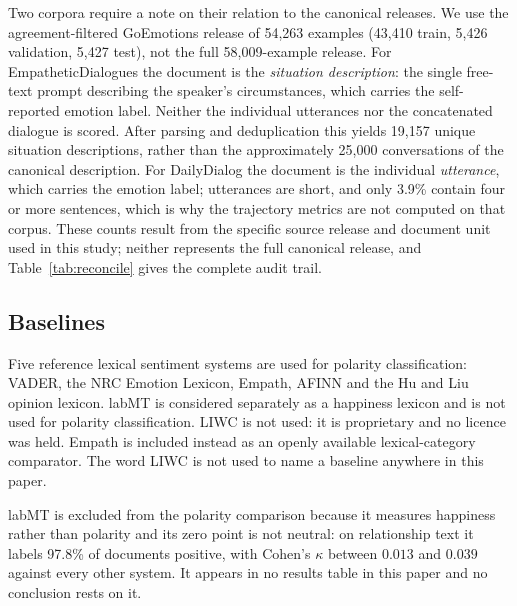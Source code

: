 \documentclass[fleqn,10pt]{wlscirep}
\begin{document}
Two corpora require a note on their relation to the canonical releases. We use the agreement-filtered GoEmotions release of 54{,}263 examples (43{,}410 train, 5{,}426 validation, 5{,}427 test), not the full 58{,}009-example release. For EmpatheticDialogues the document is the \emph{situation description}: the single free-text prompt describing the speaker's circumstances, which carries the self-reported emotion label. Neither the individual utterances nor the concatenated dialogue is scored. After parsing and deduplication this yields 19{,}157 unique situation descriptions, rather than the approximately 25{,}000 conversations of the canonical description. For DailyDialog the document is the individual \emph{utterance}, which carries the emotion label; utterances are short, and only 3.9\% contain four or more sentences, which is why the trajectory metrics are not computed on that corpus. These counts result from the specific source release and document unit used in this study; neither represents the full canonical release, and Table~\ref{tab:reconcile} gives the complete audit trail.

\subsection{Baselines}\label{subsec:baselines}

Five reference lexical sentiment systems are used for polarity classification: VADER\cite{hutto2014}, the NRC Emotion Lexicon\cite{mohammad2013}, Empath\cite{fast2016}, AFINN\cite{nielsen2011} and the Hu and Liu opinion lexicon\cite{hu2004}. labMT\cite{dodds2010} is considered separately as a happiness lexicon and is not used for polarity classification. LIWC\cite{tausczik2010,boyd2022} is not used: it is proprietary and no licence was held. Empath\cite{fast2016} is included instead as an openly available lexical-category comparator. The word LIWC is not used to name a baseline anywhere in this paper.

labMT is excluded from the polarity comparison because it measures happiness rather than polarity and its zero point is not neutral: on relationship text it labels 97.8\% of documents positive, with Cohen's $\kappa$ between $0.013$ and $0.039$ against every other system. It appears in no results table in this paper and no conclusion rests on it.
\end{document}
